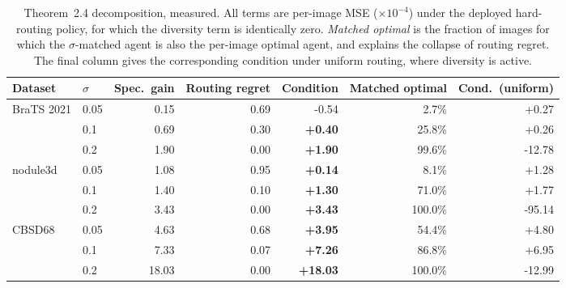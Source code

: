 \begin{table}[!t]
\centering
\caption{Theorem~2.4 decomposition, measured. All terms are per-image MSE ($\times 10^{-4}$) under the deployed hard-routing policy, for which the diversity term is identically zero. \emph{Matched optimal} is the fraction of images for which the $\sigma$-matched agent is also the per-image optimal agent, and explains the collapse of routing regret. The final column gives the corresponding condition under uniform routing, where diversity is active.}
\label{tab:theorem}
\begin{tabular}{llrrrrr}
\toprule
Dataset & $\sigma$ & Spec.\ gain & Routing regret & Condition & Matched optimal & Cond.\ (uniform) \\
\midrule
BraTS 2021 & 0.05 & 0.15 & 0.69 & -0.54 & 2.7\% & +0.27 \\
 & 0.1 & 0.69 & 0.30 & \textbf{+0.40} & 25.8\% & +0.26 \\
 & 0.2 & 1.90 & 0.00 & \textbf{+1.90} & 99.6\% & -12.78 \\
\midrule
nodule3d & 0.05 & 1.08 & 0.95 & \textbf{+0.14} & 8.1\% & +1.28 \\
 & 0.1 & 1.40 & 0.10 & \textbf{+1.30} & 71.0\% & +1.77 \\
 & 0.2 & 3.43 & 0.00 & \textbf{+3.43} & 100.0\% & -95.14 \\
\midrule
CBSD68 & 0.05 & 4.63 & 0.68 & \textbf{+3.95} & 54.4\% & +4.80 \\
 & 0.1 & 7.33 & 0.07 & \textbf{+7.26} & 86.8\% & +6.95 \\
 & 0.2 & 18.03 & 0.00 & \textbf{+18.03} & 100.0\% & -12.99 \\
\bottomrule
\end{tabular}
\end{table}
